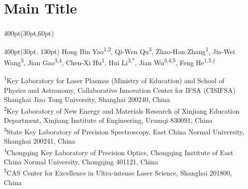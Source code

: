 \section{Main Title}
\begin{frame}
\frametitle{}
\framesubtitle{}

\small
\begin{textblock*}{400pt}(30pt,60pt)
\end{textblock*}

\begin{textblock*}{400pt}(30pt, 130pt)
\centering\footnotesize
Hong Bin Yao\textsuperscript{1,2},
Qi-Wen Qu\textsuperscript{3},
Zhao-Han Zhang\textsuperscript{1},
Jia-Wei Wang\textsuperscript{3},
Jian Gao\textsuperscript{3,4},
Chen-Xi Hu\textsuperscript{1},
Hui Li\textsuperscript{3,*},
Jian Wu\textsuperscript{3,4,5},
Feng He\textsuperscript{1,5,$\dagger$}

\vspace{10pt}
\tiny
\textsuperscript{1}Key Laboratory for Laser Plasmas (Ministry of Education)
and School of Physics and Astronomy,
Collaborative Innovation Center for IFSA (CISIFSA) 
Shanghai Jiao Tong University, Shanghai 200240, China  \\
\textsuperscript{2}Key Laboratory of New Energy and Materials Research of
Xinjiang Education Department,
Xinjiang Institute of Engineering, Urumqi 830091, China\\
\textsuperscript{3}State Key Laboratory of Precision Spectroscopy, 
East China Normal University,
Shanghai 200241, China\\
\textsuperscript{4}Chongqing Key Laboratory of Precision Optics, 
Chongqing Institute of East China Normal University, Chongqing 401121, China\\
\textsuperscript{5}CAS Center for Excellence in Ultra-intense Laser Science,
Shanghai 201800, China\\
\end{textblock*}


\end{frame}
